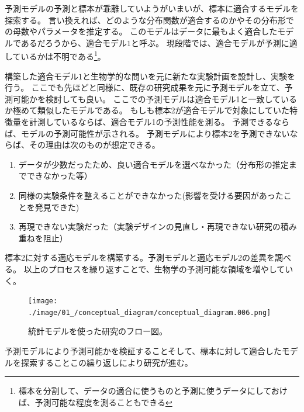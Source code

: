 予測モデルの予測と標本が乖離していようがいまいが、標本に適合するモデルを探索する。
言い換えれば、どのような分布関数が適合するのかやその分布形での母数やパラメータを推定する。
このモデルはデータに最もよく適合したモデルであるだろうから、適合モデル$1$と呼ぶ。
現段階では、適合モデルが予測に適しているかは不明である\footnote{標本を分割して、データの適合に使うものと予測に使うデータにしておけば、予測可能な程度を測ることもできる}。

構築した適合モデル$1$と生物学的な問いを元に新たな実験計画を設計し、実験を行う。
ここでも先ほどと同様に、既存の研究成果を元に予測モデルを立て、予測可能かを検討しても良い。
ここでの予測モデルは適合モデル1と一致しているか極めて類似したモデルである。
もしも標本2が適合モデルで対象にしていた特徴量を計測しているならば、適合モデル1の予測性能を測る。
予測できるならば、モデルの予測可能性が示される。
予測モデルにより標本2を予測できないならば、その理由は次のものが想定できる。
\begin{enumerate}
    \item データが少数だったため、良い適合モデルを選べなかった（分布形の推定までできなかった等）
    \item 同様の実験条件を整えることができなかった(影響を受ける要因があったことを発見できた)
    \item 再現できない実験だった（実験デザインの見直し・再現できない研究の積み重ねを阻止）
\end{enumerate}

標本2に対する適応モデルを構築する。予測モデルと適応モデル2の差異を調べる。
以上のプロセスを繰り返すことで、生物学の予測可能な領域を増やしていく。

\begin{figure}
    \begin{center}
        \texttt{[image: ./image/01\_/conceptual\_diagram/conceptual\_diagram.006.png]}
        \caption{統計モデルを使った研究のフロー図。}
        \label{fig:conceptual_diagram_statistics_research}
    \end{center}
\end{figure}

予測モデルにより予測可能かを検証することそして、標本に対して適合したモデルを探索することこの繰り返しにより研究が進む。


